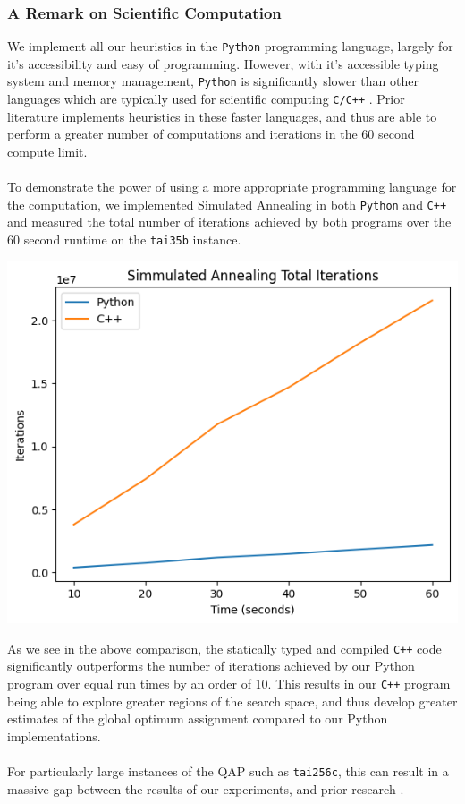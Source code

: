 \documentclass[a4paper,10pt]{article}
\begin{document}
\subsubsection*{A Remark on Scientific Computation}
We implement all our heuristics in the \texttt{Python} programming language, largely for it's accessibility and easy of programming. However, with it's accessible typing system and memory management, \texttt{Python} is significantly slower than other languages which are typically used for scientific computing \texttt{C/C++} . Prior literature \cite{stuzle, TATE199573, Sahni} implements heuristics in these faster languages, and thus are able to perform a greater number of computations and iterations in the 60 second compute limit.  \\
\\
To demonstrate the power of using a more appropriate programming language for the computation, we implemented Simulated Annealing in both \texttt{Python} and \texttt{C++} and measured the total number of iterations achieved by both programs over the 60 second runtime on the \texttt{tai35b} instance.
\begin{center}
    \includegraphics[scale=0.65]{images/TimeComparison.png}
\end{center}
As we see in the above comparison, the statically typed and compiled \texttt{C++} code significantly outperforms the number of iterations achieved by our Python program over equal run times by an order of 10. This results in our \texttt{C++} program being able to explore greater regions of the search space, and thus develop greater estimates of the global optimum assignment compared to our Python implementations. \\
\\
For particularly large instances of the QAP such as \texttt{tai256c}, this can result in a massive gap between the results of our experiments, and prior research \cite{1994Improved,Loiola07,stuzle,TATE199573}.
\end{document}
